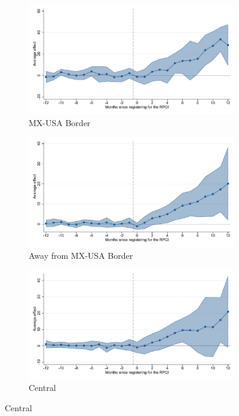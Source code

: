 \begin{figure}[H]
    \centering
    \caption{Event studies - RPCI effect on wages}
    
    \begin{subfigure}{0.32\textwidth}
    \caption{MX-USA Border}
    \includegraphics[width=\textwidth]{04_Figures/muestra_10porciento/event_study_sal_cierre_frontera_dcdh_connected.pdf}
    \end{subfigure}
    \begin{subfigure}{0.32\textwidth}
    \caption{Away from MX-USA Border}
    \includegraphics[width=\textwidth]{04_Figures/muestra_10porciento/event_study_sal_cierre_no_frontera_dcdh_connected.pdf}
    \end{subfigure}
    \begin{subfigure}{0.32\textwidth}
    \caption{Central}
    \includegraphics[width=\textwidth]{04_Figures/muestra_10porciento/event_study_sal_cierre_reg_centro_dcdh_connected.pdf}
    \end{subfigure}
    

\end{figure}
